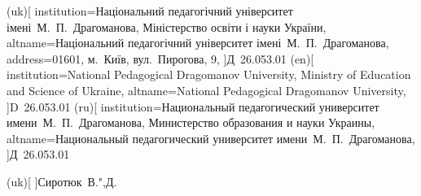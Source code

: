 \documentclass[
]{mon2017dev-aref}[2021/07/21]
\theoremstyle{plain}
\theoremstyle{definition}
\theoremstyle{remark}
\begin{document}

\council(uk)[
  institution={Національний педагогічний університет імені~М.~П.~Драгоманова,
    Міністерство освіти і науки України},
  altname=Національний педагогічний університет імені~М.~П.~Драгоманова,
  address={01601, м.~Київ, вул.~Пирогова, 9},
]{Д~26.053.01}
\council(en)[
  institution={National Pedagogical Dragomanov University,
    Ministry of Education and Science of Ukraine},
  altname=National Pedagogical Dragomanov University,
]{D~26.053.01}
\council(ru)[
  institution={Национальный педагогический университет имени~М.~П.~Драгоманова,
    Министерство образования и науки Украины},
  altname=Национальный педагогический университет имени~М.~П.~Драгоманова,
]{Д~26.053.01}

\secretary(uk)[
]{Сиротюк~В.",Д.}


\end{document}
